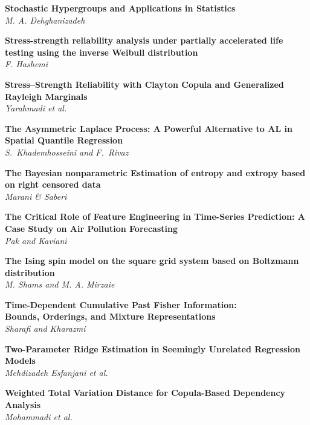 \noindent
{\bf
Stochastic Hypergroups and Applications in Statistics
}\dotfill \pageref{p.1120}\\
{\small \it
M. A. Dehghanizadeh
}


\noindent
{\bf
Stress-strength reliability analysis under partially accelerated life testing using the inverse Weibull distribution
}\dotfill \pageref{p.1230}\\
{\small \it
F. Hashemi
}


\noindent
{\bf
Stress–Strength Reliability with Clayton Copula and Generalized Rayleigh Marginals
}\dotfill \pageref{p.1084}\\
{\small \it
Yarahmadi et al.
}


\noindent
{\bf
The Asymmetric Laplace Process: A Powerful Alternative to AL in Spatial Quantile Regression
}\dotfill \pageref{p.1295}\\
{\small \it
S.\ Khademhosseini and F.\ Rivaz
}


\noindent
{\bf
The Bayesian nonparametric Estimation of entropy and extropy based on right censored data
}\dotfill \pageref{p.1283}\\
{\small \it
Marani \& Saberi
}


\noindent
{\bf
The Critical Role of Feature Engineering in Time-Series Prediction: A Case Study on Air Pollution Forecasting
}\dotfill \pageref{p.1254}\\
{\small \it
Pak and Kaviani
}


\noindent
{\bf
The Ising spin model on the square grid system based on Boltzmann distribution
}\dotfill \pageref{p.1009}\\
{\small \it
M. Shams and M. A. Mirzaie
}


\noindent
{\bf
Time‑Dependent Cumulative Past Fisher Information: \\ Bounds, Orderings, and Mixture Representations
}\dotfill \pageref{p.1183}\\
{\small \it
Sharafi and Kharazmi
}


\noindent
{\bf
Two-Parameter Ridge Estimation in Seemingly Unrelated Regression Models
}\dotfill \pageref{p.1324}\\
{\small \it
Mehdizadeh Esfanjani et al.
}


\noindent
{\bf
Weighted Total Variation Distance for Copula-Based Dependency Analysis
}\dotfill \pageref{p.1253}\\
{\small \it
Mohammadi et al.
}

